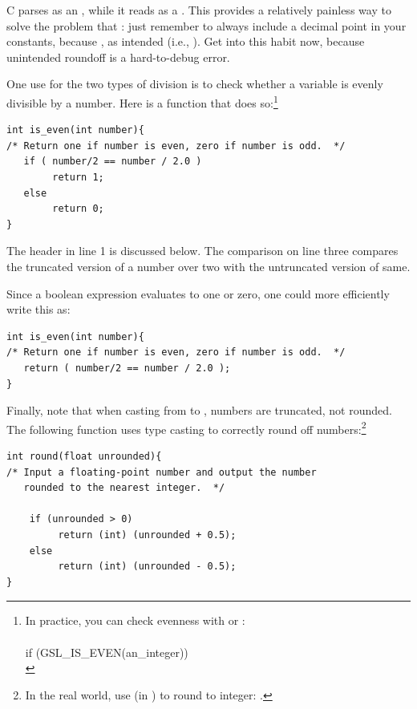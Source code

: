C parses  as an , while it reads 
as a . This provides a relatively painless way to solve
the problem that : just remember to always include
a decimal point in your constants, because ,
as intended (i.e., ). Get into this
habit now, because unintended roundoff is a hard-to-debug error.

One use for the two types of division is to check whether a variable is evenly divisible by a number. Here
is a function that does so:\footnote{In practice, you can check evenness
with  or :\\ 
\\
if (GSL\_IS\_EVEN(an\_integer))\\
\phantom{hello.}
}

\lstset{numbers=left, numberstyle=\scshape}\label{isevenfn}
\begin{lstlisting}
int is_even(int number){
/* Return one if number is even, zero if number is odd.  */
   if ( number/2 == number / 2.0 )
        return 1;
   else 
        return 0;
}
\end{lstlisting}
The header in line 1 is discussed below. The comparison on line three
compares the truncated version of a number over two with the untruncated
version of same.

Since a boolean expression evaluates to one or zero,
one could more efficiently write this as:
\begin{lstlisting}
int is_even(int number){
/* Return one if number is even, zero if number is odd.  */
   return ( number/2 == number / 2.0 );
}
\end{lstlisting}

Finally, note that when casting from  to , numbers
are truncated, not rounded.  The following function uses type casting
to correctly round off numbers:\footnote{In the real world, use
 (in ) to round to integer: .}

\begin{lstlisting}
int round(float unrounded){
/* Input a floating-point number and output the number
   rounded to the nearest integer.  */

    if (unrounded > 0)
         return (int) (unrounded + 0.5);
    else
         return (int) (unrounded - 0.5);
}
\end{lstlisting}
\lstset{numbers=none}


